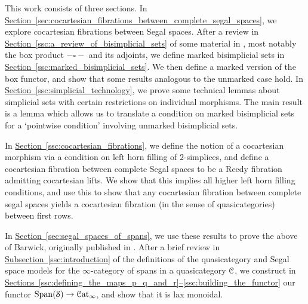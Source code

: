 \documentclass[main.tex]{subfiles}
\begin{document}
This work consists of three sections. In \hyperref[sec:cocartesian_fibrations_between_complete_segal_spaces]{Section~\ref*{sec:cocartesian_fibrations_between_complete_segal_spaces}}, we explore cocartesian fibrations between Segal spaces. After a review in \hyperref[ssc:a_review_of_bisimplicial_sets]{Section~\ref*{ssc:a_review_of_bisimplicial_sets}} of some material in \cite{qcats_vs_segal_spaces}, most notably the box product $- \square -$ and its adjoints, we define marked bisimplicial sets in \hyperref[ssc:marked_bisimplicial_sets]{Section~\ref*{ssc:marked_bisimplicial_sets}}. We then define a marked version of the box functor, and show that some results analogous to the unmarked case hold. In \hyperref[ssc:simplicial_technology]{Section~\ref*{ssc:simplicial_technology}}, we prove some technical lemmas about simplicial sets with certain restrictions on individual morphisms. The main result is a lemma which allows us to translate a condition on marked bisimplicial sets for a `pointwise condition' involving unmarked bisimplicial sets.

In \hyperref[ssc:cocartesian_fibrations]{Section~\ref*{ssc:cocartesian_fibrations}}, we define the notion of a cocartesian morphism via a condition on left horn filling of $2$-simplices, and define a cocartesian fibration between complete Segal spaces to be a Reedy fibration admitting cocartesian lifts. We show that this implies all higher left horn filling conditions, and use this to show that any cocartesian fibration between complete segal spaces yields a cocartesian fibration (in the sense of quasicategories) between first rows.

In \hyperref[sec:segal_spaces_of_spans]{Section~\ref*{sec:segal_spaces_of_spans}}, we use these results to prove the above of Barwick, originally published in \cite[Thm. 12.2]{spectralmackeyfunctors1}. After a brief review in \hyperref[ssc:introduction]{Subsection~\ref*{ssc:introduction}} of the definitions of the quasicategory and Segal space models for the $\infty$-category of spans in a quasicategory $\mathcal{C}$, we construct in \hyperref[ssc:defining_the_maps_p_q_and_r]{Sections~\ref*{ssc:defining_the_maps_p_q_and_r}--\ref*{ssc:building_the_functor}} our functor $\mathrm{Span}(\mathcal{S}) \to \mathcal{C}\mathrm{at}_{\infty}$, and show that it is lax monoidal.
\end{document}
